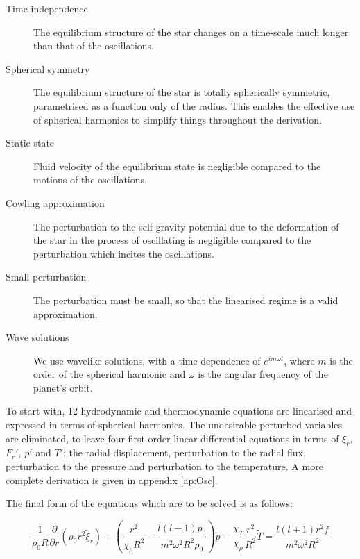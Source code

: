 \documentclass[11pt]{amsart}
\begin{document}
\begin{description}
\item[Time independence]
 The equilibrium structure of the star changes on a time-scale much longer than that of the oscillations.
 
 \item[Spherical symmetry]
 The equilibrium structure of the star is totally spherically symmetric, parametrised as a function only of the radius.  This enables the effective use of spherical harmonics to simplify things throughout the derivation.
 
 \item[Static state]
 Fluid velocity of the equilibrium state is negligible compared to the motions of the oscillations.
 
 \item[Cowling approximation]
 The perturbation to the self-gravity potential due to the deformation of the star in the process of oscillating is negligible compared to the perturbation which incites the oscillations.
 
 \item[Small perturbation]
 The perturbation must be small, so that the linearised regime is a valid approximation.
 
 \item[Wave solutions]
 We use wavelike solutions, with a time dependence of $e^{i m \omega t}$, where $m$ is the order of the spherical harmonic and $\omega$ is the angular frequency of the planet's orbit.
\end{description}


To start with, 12 hydrodynamic and thermodynamic equations are linearised and expressed in terms of spherical harmonics. The undesirable perturbed variables are eliminated, to leave four first order linear differential equations in terms of $\xi_{r}$, $F_{r}'$, $p'$ and $T'$; the radial displacement, perturbation to the radial flux, perturbation to the pressure and perturbation to the temperature.  A more complete derivation is given in appendix \ref{ap:Osc}.

The final form of the equations which are to be solved is as follows:


\begin{equation} \label{eq:cont_osc_dim2}
\frac{1}{\rho_{0} R}  \frac{\partial}{\partial r}\left( \rho_{0} r^{2} \tilde{\xi}_{r} \right)
+ \left( \frac{r^{2}}{\chi_{\rho} R^{2}} - \frac{l (l+1) p_{0}}{m^{2} \omega^{2} R^{2} \rho_{0} } \right) \tilde{p}
- \frac{\chi_{T}}{\chi_{\rho}} \frac{r^{2}}{R^{2}} \tilde{T}
=
\frac{l (l+1) r^{2} f}{m^{2} \omega^{2} R^{2}}
\end{equation}
\end{document}
